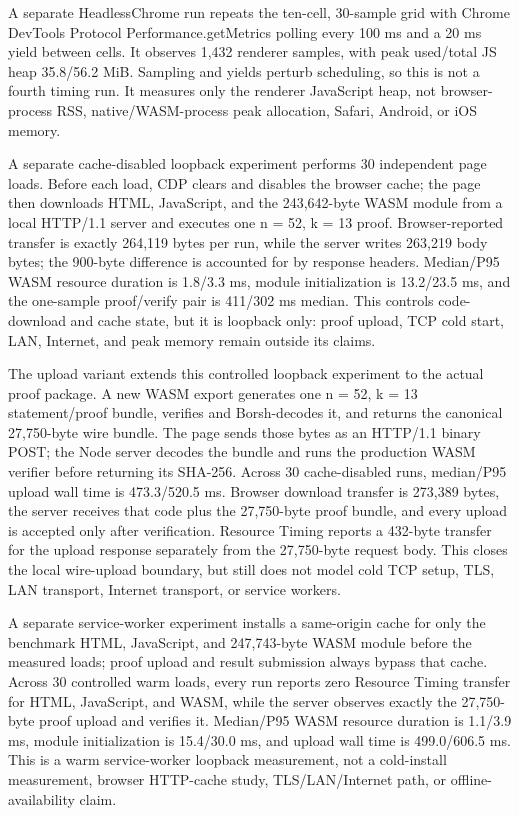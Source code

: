 \documentclass[11pt]{article}
\begin{document}
A separate HeadlessChrome run repeats the ten-cell, 30-sample grid with Chrome DevTools Protocol Performance.getMetrics polling every 100 ms and a 20 ms yield between cells. It observes 1,432 renderer samples, with peak used/total JS heap 35.8/56.2 MiB. Sampling and yields perturb scheduling, so this is not a fourth timing run. It measures only the renderer JavaScript heap, not browser-process RSS, native/WASM-process peak allocation, Safari, Android, or iOS memory.

A separate cache-disabled loopback experiment performs 30 independent page loads. Before each load, CDP clears and disables the browser cache; the page then downloads HTML, JavaScript, and the 243,642-byte WASM module from a local HTTP/1.1 server and executes one n = 52, k = 13 proof. Browser-reported transfer is exactly 264,119 bytes per run, while the server writes 263,219 body bytes; the 900-byte difference is accounted for by response headers. Median/P95 WASM resource duration is 1.8/3.3 ms, module initialization is 13.2/23.5 ms, and the one-sample proof/verify pair is 411/302 ms median. This controls code-download and cache state, but it is loopback only: proof upload, TCP cold start, LAN, Internet, and peak memory remain outside its claims.

The upload variant extends this controlled loopback experiment to the actual proof package. A new WASM export generates one n = 52, k = 13 statement/proof bundle, verifies and Borsh-decodes it, and returns the canonical 27,750-byte wire bundle. The page sends those bytes as an HTTP/1.1 binary POST; the Node server decodes the bundle and runs the production WASM verifier before returning its SHA-256. Across 30 cache-disabled runs, median/P95 upload wall time is 473.3/520.5 ms. Browser download transfer is 273,389 bytes, the server receives that code plus the 27,750-byte proof bundle, and every upload is accepted only after verification. Resource Timing reports a 432-byte transfer for the upload response separately from the 27,750-byte request body. This closes the local wire-upload boundary, but still does not model cold TCP setup, TLS, LAN transport, Internet transport, or service workers.

A separate service-worker experiment installs a same-origin cache for only the benchmark HTML, JavaScript, and 247,743-byte WASM module before the measured loads; proof upload and result submission always bypass that cache. Across 30 controlled warm loads, every run reports zero Resource Timing transfer for HTML, JavaScript, and WASM, while the server observes exactly the 27,750-byte proof upload and verifies it. Median/P95 WASM resource duration is 1.1/3.9 ms, module initialization is 15.4/30.0 ms, and upload wall time is 499.0/606.5 ms. This is a warm service-worker loopback measurement, not a cold-install measurement, browser HTTP-cache study, TLS/LAN/Internet path, or offline-availability claim.
\end{document}
